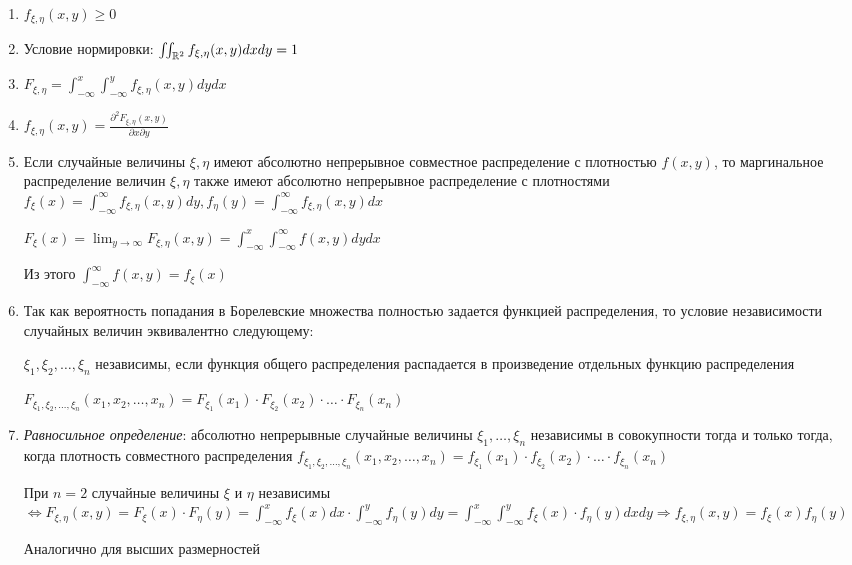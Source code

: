 \documentclass[12pt]{article}
\begin{document}
    \begin{enumerate}
        \item $f_{\xi, \eta}(x, y) \geq 0$
        \item Условие нормировки: $\iint_{\mathbb{R}^2} f_{\xi, \eta}(x, y) dxdy = 1$
        \item $F_{\xi, \eta} = \int_{-\infty}^x \int_{-\infty}^y f_{\xi, \eta}(x, y) dydx$

        \item $f_{\xi, \eta}(x, y) = \frac{\partial^2 F_{\xi, \eta}(x, y)}{\partial x \partial y}$
        
        \item Если случайные величины $\xi, \eta$ имеют абсолютно непрерывное совместное распределение с плотностью $f(x, y)$, 
        то маргинальное распределение величин $\xi, \eta$ также имеют абсолютно непрерывное распределение
        с плотностями $f_\xi(x) = \int_{-\infty}^\infty f_{\xi, \eta}(x, y) dy, f_\eta(y) = \int_{-\infty}^\infty f_{\xi, \eta}(x, y) dx$

        \begin{MyProof}
            $F_{\xi}(x) = \lim_{y \to \infty} F_{\xi, \eta}(x, y) = \int_{-\infty}^x \int_{-\infty}^\infty f(x, y) dydx$

            Из этого $\int_{-\infty}^\infty f(x, y) = f_\xi(x)$
        \end{MyProof}

        \item Так как вероятность попадания в Борелевские множества полностью задается функцией распределения, 
        то условие независимости случайных величин эквивалентно следующему:

        $\xi_1, \xi_2, \dots, \xi_n$ независимы, если функция общего распределения распадается в произведение 
        отдельных функцию распределения
    
        $F_{\xi_1, \xi_2, \dots, \xi_n}(x_1, x_2, \dots, x_n) = F_{\xi_1}(x_1) \cdot F_{\xi_2}(x_2) \cdot \dots \cdot F_{\xi_n}(x_n)$

        \item \textit{Равносильное определение}: абсолютно непрерывные случайные величины $\xi_1, \dots, \xi_n$ независимы в совокупности тогда и только тогда, 
        когда плотность совместного распределения $f_{\xi_1, \xi_2, \dots, \xi_n}(x_1, x_2, \dots, x_n) = f_{\xi_1}(x_1) \cdot f_{\xi_2}(x_2) \cdot \dots \cdot f_{\xi_n}(x_n)$
    
        \begin{MyProof}
            При $n = 2$ случайные величины $\xi$ и $\eta$ независимы $\Longleftrightarrow F_{\xi, \eta}(x, y) = F_\xi(x) \cdot F_\eta(y) = \int_{-\infty}^x f_\xi(x) dx \cdot \int_{-\infty}^y f_\eta(y) dy = \int_{-\infty}^x \int_{-\infty}^y f_\xi(x) \cdot f_\eta(y) dxdy \Longrightarrow f_{\xi,\eta}(x, y) = f_\xi(x)f_\eta(y)$

            Аналогично для высших размерностей
        \end{MyProof}

    \end{enumerate}
\end{document}
